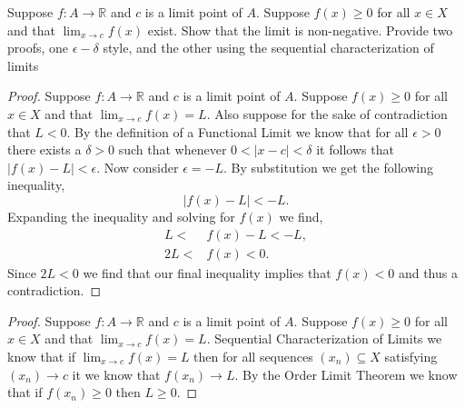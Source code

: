 \documentclass[12pt]{article}
\makeatletter
\theoremstyle{homework}
\newenvironment{exercise}[1]
{\def\@currentlabel{#1}\exercisecore}
{\endexercisecore}
\newcommand{\Reals}{\ensuremath{\mathbb R}}
\makeatother
\begin{document}
%
%
%

\begin{exercise}{1} Suppose $f: A \to \Reals$ and $c$ is a limit point of $A$. Suppose $f(x) \geq 0$ for all 
  $x \in X$ and that $\lim_{x \to c}f(x)$ exist. Show that the limit is non-negative. Provide two proofs, one $\epsilon-\delta$
  style, and the other using the sequential characterization of limits\\


  \begin{proof}
    Suppose $f: A \to \Reals$ and $c$ is a limit point of $A$. Suppose $f(x) \geq 0$ for all 
  $x \in X$ and that $\lim_{x \to c}f(x) = L$. Also suppose for the sake of contradiction that $L < 0$. By the definition of a Functional Limit
  we know that for all $\epsilon > 0$ there exists a $\delta > 0$ such that whenever $0 < |x - c|< \delta$ it follows that $|f(x) - L|< \epsilon$.
  Now consider $\epsilon = -L$. By substitution we get the following inequality,
  \begin{equation*}
    |f(x) - L|< -L.
  \end{equation*}
  Expanding the inequality and solving for $f(x)$ we find,
  \begin{align*}
    L < &f(x) - L < -L,\\
    2L < &f(x) < 0.
  \end{align*}
  Since $2L < 0$ we find that our final inequality implies that $f(x)<0$ and thus a contradiction. 
  
\end{proof}

\begin{proof}
  Suppose $f: A \to \Reals$ and $c$ is a limit point of $A$. Suppose $f(x) \geq 0$ for all 
  $x \in X$ and that $\lim_{x \to c}f(x) = L$.  Sequential Characterization of Limits we know that if $\lim_{x \to c}f(x) = L$ then for all sequences 
  $(x_n)\subseteq X$ satisfying $(x_n) \to c$ it we know that $f(x_n) \to L$. By the Order Limit Theorem we know that if $f(x_n)\geq 0$ then $L \geq 0$.
\end{proof}

\end{exercise}
\vspace{.5in}
\end{document}

